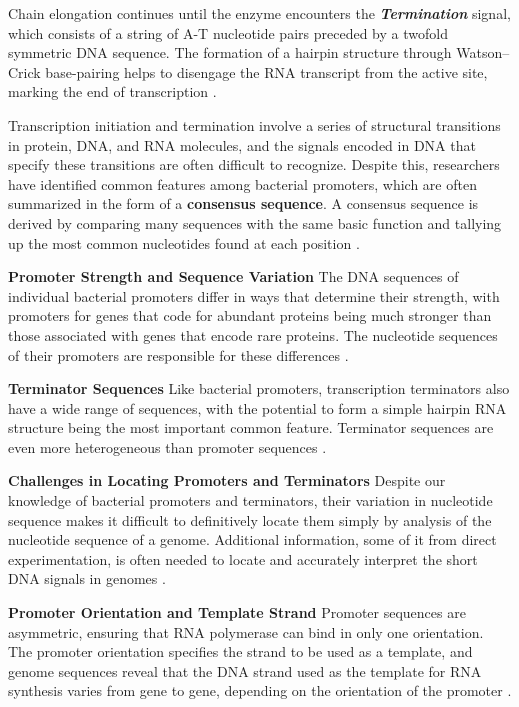 Chain elongation continues until the enzyme encounters the \textbf{\textit{Termination}} signal, which consists of a string of A-T nucleotide pairs preceded by a twofold symmetric DNA sequence. The formation of a hairpin structure through Watson–Crick base-pairing helps to disengage the RNA transcript from the active site, marking the end of transcription \cite*{L1-Chapter6}.

Transcription initiation and termination involve a series of structural transitions in protein, DNA, and RNA molecules, and the signals encoded in DNA that specify these transitions are often difficult to recognize. Despite this, researchers have identified common features among bacterial promoters, which are often summarized in the form of a \textbf{consensus sequence}. A consensus sequence is derived by comparing many sequences with the same basic function and tallying up the most common nucleotides found at each position \cite*{L1-Chapter6}.

\textbf{Promoter Strength and Sequence Variation}
The DNA sequences of individual bacterial promoters differ in ways that determine their strength, with promoters for genes that code for abundant proteins being much stronger than those associated with genes that encode rare proteins. The nucleotide sequences of their promoters are responsible for these differences \cite*{L1-Chapter6}.

\textbf{Terminator Sequences}
Like bacterial promoters, transcription terminators also have a wide range of sequences, with the potential to form a simple hairpin RNA structure being the most important common feature. Terminator sequences are even more heterogeneous than promoter sequences \cite*{L1-Chapter6}.

\textbf{Challenges in Locating Promoters and Terminators}
Despite our knowledge of bacterial promoters and terminators, their variation in nucleotide sequence makes it difficult to definitively locate them simply by analysis of the nucleotide sequence of a genome. Additional information, some of it from direct experimentation, is often needed to locate and accurately interpret the short DNA signals in genomes \cite*{L1-Chapter6}.

\textbf{Promoter Orientation and Template Strand}
Promoter sequences are asymmetric, ensuring that RNA polymerase can bind in only one orientation. The promoter orientation specifies the strand to be used as a template, and genome sequences reveal that the DNA strand used as the template for RNA synthesis varies from gene to gene, depending on the orientation of the promoter \cite*{L1-Chapter6}.

